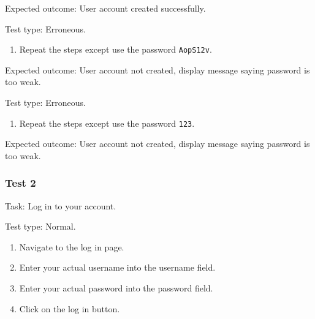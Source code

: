 {\sffamily Expected outcome:} User account created successfully. \\

{\color{gray} \hrulefill}

{\sffamily Test type: Erroneous.}\\

\begin{enumerate}
\item Repeat the steps except use the password \texttt{AopS12v}.\\
\end{enumerate}

{\sffamily Expected outcome:} User account not created, display message saying password is too weak.\\

{\color{gray} \hrulefill}

{\sffamily Test type: Erroneous.} \\

\begin{enumerate}
\item Repeat the steps except use the password \texttt{123}.
\end{enumerate}

{\sffamily Expected outcome:} User account not created, display
message saying password is too weak.\\

{\color{gray} \hrulefill}

\vspace{0.2cm}

\subsubsection{Test 2}

{\sffamily Task:} Log in to your account.\\

{\color{gray} \hrulefill}

{\sffamily Test type: Normal.}\\

\begin{enumerate}
  \item Navigate to the log in page.
  \item Enter your actual username into the username field.
  \item Enter your actual password into the password field.
  \item Click on the log in button.
\end{enumerate}

